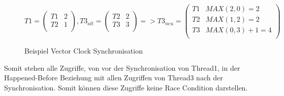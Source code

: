 \documentclass[10pt,a4paper]{article}
\begin{document}
\begin{figure}[H]
\[
	T1 = \begin{pmatrix}
		T1 & 2\\
		T2 & 1\\
	\end{pmatrix},
	T3_{alt} = \begin{pmatrix}
		T2 & 2\\
		T3 & 3\\
	\end{pmatrix} =>
	T3_{neu} = \begin{pmatrix}
		T1 & MAX(2, 0) = 2\\
		T2 & MAX(1, 2) = 2\\
		T3 & MAX(0, 3) + 1 = 4\\
	\end{pmatrix}
\]
\caption{Beispiel Vector Clock Synchronisation}\label{example_vectorClockSync}
\end{figure}
Somit stehen alle Zugriffe, von vor der Synchronisation von Thread1, in der Happened-Before Beziehung mit allen Zugriffen von Thread3 nach der Synchronisation. Somit können diese Zugriffe keine Race Condition darstellen.
\end{document}
